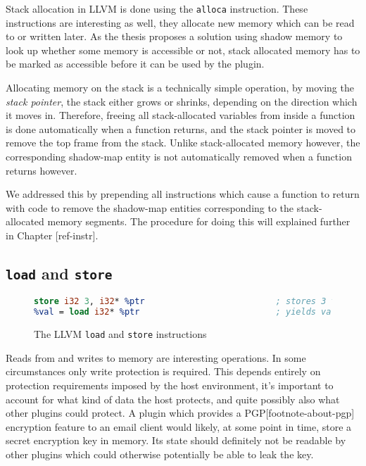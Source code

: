 \noindent Stack allocation in LLVM is done using the \texttt{alloca}
instruction.
These instructions are interesting as well, they allocate new memory which can
be read to or written later.
As the thesis proposes a solution using shadow memory to look up whether some
memory is accessible or not, stack allocated memory has to be marked as
accessible before it can be used by the plugin.

Allocating memory on the stack is a technically simple operation, by moving the
\emph{stack pointer}, the stack either grows or shrinks, depending on the
direction which it moves in.
Therefore, freeing all stack-allocated variables from inside a function is done
automatically when a function returns, and the stack pointer is moved to remove
the top frame from the stack.
Unlike stack-allocated memory however, the corresponding shadow-map entity is
not automatically removed when a function returns however.

We addressed this by prepending all instructions which cause a function to
return with code to remove the shadow-map entities corresponding to the
stack-allocated memory segments.
The procedure for doing this will explained further in Chapter [ref-instr].

\subsection {\texttt{load} and \texttt{store}}

\begin{figure}[ht]
\begin{lstlisting}[language=llvm]
store i32 3, i32* %ptr                          ; stores 3 to *ptr
%val = load i32* %ptr                           ; yields val = *ptr
\end{lstlisting}
\caption{The LLVM \texttt{load} and \texttt{store} instructions}
\end{figure}

\noindent Reads from and writes to memory are interesting operations.
In some circumstances only write protection is required.
This depends entirely on protection requirements imposed by the host
environment, it's important to account for what kind of data the host protects,
and quite possibly also what other plugins could protect.
A plugin which provides a PGP[footnote-about-pgp] encryption feature to an email
client would likely, at some point in time, store a secret encryption key in
memory.
Its state should definitely not be readable by other plugins which could
otherwise potentially be able to leak the key.

